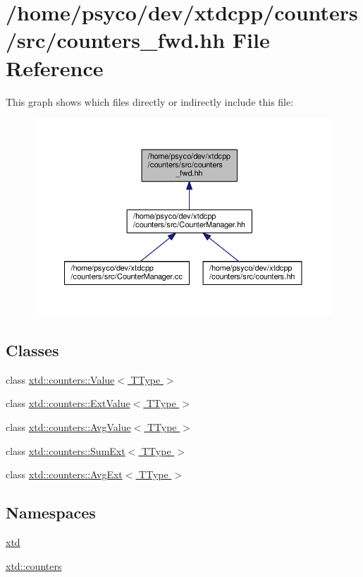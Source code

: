 \hypertarget{counters__fwd_8hh}{}\section{/home/psyco/dev/xtdcpp/counters/src/counters\+\_\+fwd.hh File Reference}
\label{counters__fwd_8hh}
This graph shows which files directly or indirectly include this file\+:
\nopagebreak
\begin{figure}[H]
\begin{center}
\leavevmode
\includegraphics[width=350pt]{counters__fwd_8hh__dep__incl}
\end{center}
\end{figure}
\subsection*{Classes}
\begin{DoxyCompactItemize}
\item 
class \hyperlink{classxtd_1_1counters_1_1Value}{xtd\+::counters\+::\+Value$<$ T\+Type $>$}
\item 
class \hyperlink{classxtd_1_1counters_1_1ExtValue}{xtd\+::counters\+::\+Ext\+Value$<$ T\+Type $>$}
\item 
class \hyperlink{classxtd_1_1counters_1_1AvgValue}{xtd\+::counters\+::\+Avg\+Value$<$ T\+Type $>$}
\item 
class \hyperlink{classxtd_1_1counters_1_1SumExt}{xtd\+::counters\+::\+Sum\+Ext$<$ T\+Type $>$}
\item 
class \hyperlink{classxtd_1_1counters_1_1AvgExt}{xtd\+::counters\+::\+Avg\+Ext$<$ T\+Type $>$}
\end{DoxyCompactItemize}
\subsection*{Namespaces}
\begin{DoxyCompactItemize}
\item 
 \hyperlink{namespacextd}{xtd}
\item 
 \hyperlink{namespacextd_1_1counters}{xtd\+::counters}
\end{DoxyCompactItemize}
